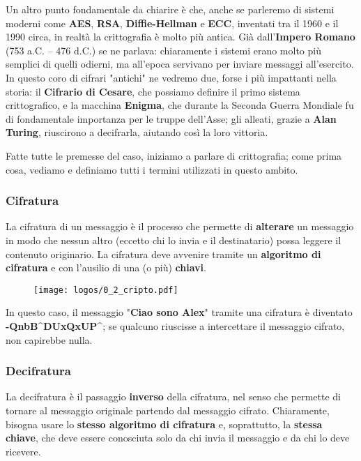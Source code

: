 \documentclass{report}
\begin{document}
\newpage

Un altro punto fondamentale da chiarire è che, anche se parleremo di sistemi moderni come \textbf{AES}, \textbf{RSA}, \textbf{Diffie-Hellman} e \textbf{ECC}, inventati tra il 1960 e il 1990 circa, in realtà la crittografia è molto più antica. Già dall’\textbf{Impero Romano} (753 a.C. – 476 d.C.) se ne parlava: chiaramente i sistemi erano molto più semplici di quelli odierni, ma all’epoca servivano per inviare messaggi all’esercito. In questo coro di cifrari "antichi" ne vedremo due, forse i più impattanti nella storia: il \textbf{Cifrario di Cesare}, che possiamo definire il primo sistema crittografico, e la macchina \textbf{Enigma}, che durante la Seconda Guerra Mondiale fu di fondamentale importanza per le truppe dell’Asse; gli alleati, grazie a \textbf{Alan Turing}, riuscirono a decifrarla, aiutando così la loro vittoria.

Fatte tutte le premesse del caso, iniziamo a parlare di crittografia; come prima cosa, vediamo e definiamo tutti i termini utilizzati in questo ambito.


\subsubsection{Cifratura} 

La cifratura di un messaggio è il processo che permette di \textbf{alterare} un messaggio in modo che nessun altro (eccetto chi lo invia e il destinatario) possa leggere il contenuto originario. La cifratura deve avvenire tramite un \textbf{algoritmo di cifratura} e con l’ausilio di una (o più) \textbf{chiavi}.


\begin{figure}[h]
     \centering
    \texttt{[image: logos/0\_2\_cripto.pdf]}
\end{figure}

In questo caso, il messaggio "\textbf{Ciao sono Alex}" tramite una cifratura è diventato \textbf{-QnbB\^{}DUxQxUP\^{}}; se qualcuno riuscisse a intercettare il messaggio cifrato, non capirebbe nulla.


\subsubsection{Decifratura} 

La decifratura è il passaggio \textbf{inverso} della cifratura, nel senso che permette di tornare al messaggio originale partendo dal messaggio cifrato. Chiaramente, bisogna usare lo \textbf{stesso algoritmo di cifratura} e, soprattutto, la \textbf{stessa chiave}, che deve essere conosciuta solo da chi invia il messaggio e da chi lo deve ricevere.
\end{document}
